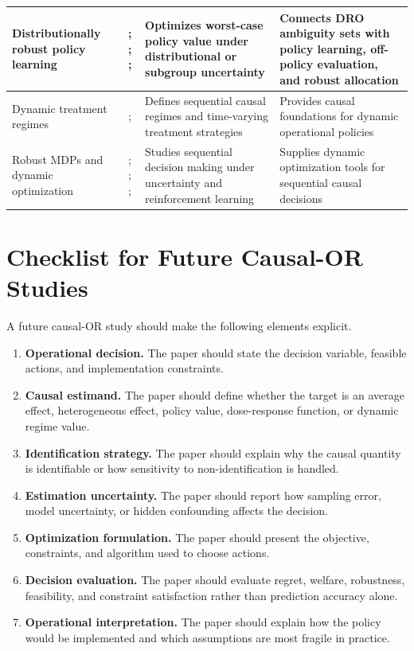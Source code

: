 \documentclass[11pt]{article}
\begin{document}
\begin{longtable}{p{} p{} p{} p{}}
\midrule
Distributionally robust policy learning & \citet{si2020dro}; \citet{duchi2023latent}; \citet{rahimian2019dro}; \citet{kuhn2019wasserstein} & Optimizes worst-case policy value under distributional or subgroup uncertainty & Connects DRO ambiguity sets with policy learning, off-policy evaluation, and robust allocation \\
\midrule
Dynamic treatment regimes & \citet{robins1986new}; \citet{murphy2003dynamic} & Defines sequential causal regimes and time-varying treatment strategies & Provides causal foundations for dynamic operational policies \\
\midrule
Robust MDPs and dynamic optimization & \citet{iyengar2005robust}; \citet{nilim2005robust}; \citet{wiesemann2013robust}; \citet{sutton2018reinforcement} & Studies sequential decision making under uncertainty and reinforcement learning & Supplies dynamic optimization tools for sequential causal decisions \\
\bottomrule
\end{longtable}

\section{Checklist for Future Causal-OR Studies}

A future causal-OR study should make the following elements explicit.

\begin{enumerate}[leftmargin=*]
    \item \textbf{Operational decision.} The paper should state the decision variable, feasible actions, and implementation constraints.
    \item \textbf{Causal estimand.} The paper should define whether the target is an average effect, heterogeneous effect, policy value, dose-response function, or dynamic regime value.
    \item \textbf{Identification strategy.} The paper should explain why the causal quantity is identifiable or how sensitivity to non-identification is handled.
    \item \textbf{Estimation uncertainty.} The paper should report how sampling error, model uncertainty, or hidden confounding affects the decision.
    \item \textbf{Optimization formulation.} The paper should present the objective, constraints, and algorithm used to choose actions.
    \item \textbf{Decision evaluation.} The paper should evaluate regret, welfare, robustness, feasibility, and constraint satisfaction rather than prediction accuracy alone.
    \item \textbf{Operational interpretation.} The paper should explain how the policy would be implemented and which assumptions are most fragile in practice.
\end{enumerate}
\end{document}
